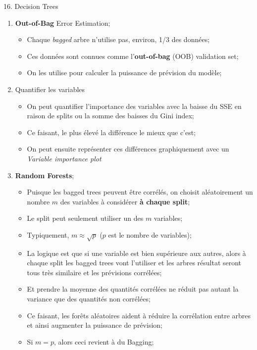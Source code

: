\documentclass[12pt, titlepage, french]{report}
\begin{document}
\begin{CHPT_SUMM}[label = {DECISION-TREES}]{16. Decision Trees}
\begin{enumerate}
\begin{itemize}
		\end{itemize}
%		
	\item[]	\textbf{Out-of-Bag} Error Estimation;
		\begin{itemize}
		\item	Chaque \textit{bagged} arbre n'utilise pas, environ, 1/3 des données;
		\item[]	Ces données sont connues comme l'\textbf{out-of-bag} (OOB) validation set;
		\item	On les utilise pour calculer la puissance de prévision du modèle;
		\end{itemize}
%		
	\item[]	Quantifier les variables
		\begin{itemize}
		\item	On peut quantifier l'importance des variables avec la baisse du SSE en raison de splits ou la somme des baisses du Gini index;
		\item[]	Ce faisant, le plus élevé la différence le mieux que c'est;
		\item	On peut ensuite représenter ces différences graphiquement avec un \textit{Variable importance plot}
		\end{itemize}
%		
	\item[]	\textbf{Random Forests};
		\begin{itemize}
		\item	Puisque les bagged trees peuvent être corrélés, on choisit aléatoirement un nombre $m$ des variables à considérer \textbf{à chaque split};
		\item[]	Le split peut seulement utiliser un des $m$ variables;
		\item	Typiquement, $m \approx \sqrt{p}$ ($p$ est le nombre de variables);
		\item	La logique est que si une variable est bien supérieure aux autres, alors à chaque split les bagged trees vont l'utiliser et les arbres résultat seront tous très similaire et les prévisions corrélées;
		\item[]	Et prendre la moyenne des quantités corrélées ne réduit pas autant la variance que des quantités non corrélées;
		\item	Ce faisant, les forêts aléatoires aident à réduire la corrélation entre arbres et ainsi augmenter la puissance de prévision;
		\item	Si $m = p$, alors ceci revient à du Bagging;
		\end{itemize}

\end{enumerate}
\end{CHPT_SUMM}
\end{document}
